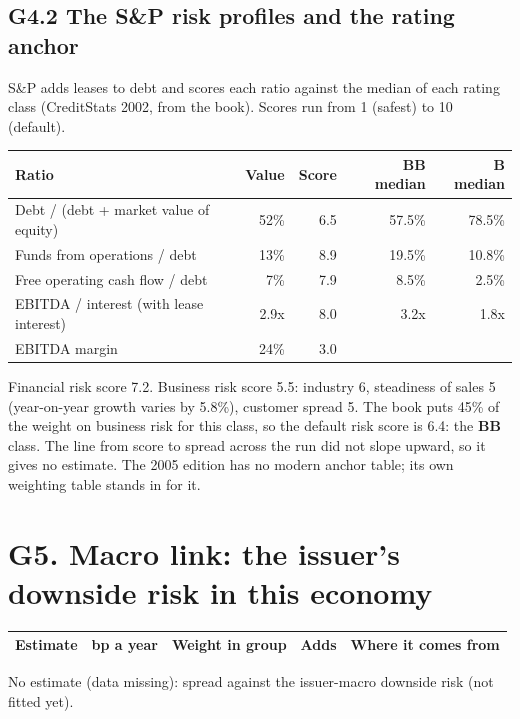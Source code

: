 \documentclass[11pt,a4paper]{article}
\begin{document}
\subsection*{G4.2 The S\&P risk profiles and the rating anchor}
S\&P adds leases to debt and scores each ratio against the median of each rating class (CreditStats 2002, from the book). Scores run from 1 (safest) to 10 (default).
\begin{center}\footnotesize\setlength{\tabcolsep}{3.5pt}\begin{tabular}{@{}lrrrr@{}}\toprule
Ratio & Value & Score & BB median & B median \\\midrule
Debt / (debt + market value of equity) & 52\% & 6.5 & 57.5\% & 78.5\% \\
Funds from operations / debt & 13\% & 8.9 & 19.5\% & 10.8\% \\
Free operating cash flow / debt & 7\% & 7.9 & 8.5\% & 2.5\% \\
EBITDA / interest (with lease interest) & 2.9x & 8.0 & 3.2x & 1.8x \\
EBITDA margin & 24\% & 3.0 &  &  \\
\bottomrule\end{tabular}\end{center}
Financial risk score 7.2. Business risk score 5.5: industry 6, steadiness of sales 5 (year-on-year growth varies by 5.8\%), customer spread 5. The book puts 45\% of the weight on business risk for this class, so the default risk score is 6.4: the \textbf{BB} class. The line from score to spread across the run did not slope upward, so it gives no estimate. The 2005 edition has no modern anchor table; its own weighting table stands in for it.
\section*{G5. Macro link: the issuer's downside risk in this economy}
\par\noindent{}
\begin{center}\footnotesize\setlength{\tabcolsep}{3.5pt}\begin{tabular}{@{}p{6.2cm}rrrp{4.2cm}@{}}\toprule
Estimate & bp a year & Weight in group & Adds & Where it comes from \\\midrule
\bottomrule\end{tabular}\end{center}
No estimate (data missing): spread against the issuer-macro downside risk (not fitted yet).
\end{document}
